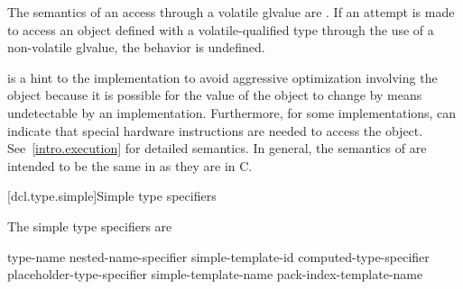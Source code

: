 \pnum
The semantics of an access through a volatile glvalue are
.
If an attempt is made to access an object defined with a
volatile-qualified type through the use of a non-volatile glvalue,
the behavior is undefined.
%
%
%
%
%

\pnum
{}%
%
\begin{note}
 is a hint to the implementation to avoid aggressive
optimization involving the object because it is possible for the value of the object
to change by means undetectable by an implementation.
Furthermore, for some implementations,  can indicate that
special hardware instructions are needed to access the object.
See~\ref{intro.execution} for detailed semantics. In general, the
semantics of  are intended to be the same in \Cpp{} as
they are in C.
\end{note}

[dcl.type.simple]{Simple type specifiers}%

\pnum
The simple type specifiers are
\begin{bnf}
\br
     type-name\br
    nested-name-specifier  simple-template-id\br
    computed-type-specifier\br
    placeholder-type-specifier\br
     simple-template-name\br
    pack-index-template-name\br
    \br
    \br
    \br
    \br
    \br
    \br
    \br
    \br
    \br
    \br
    \br
    \br
    \br
\end{bnf}

